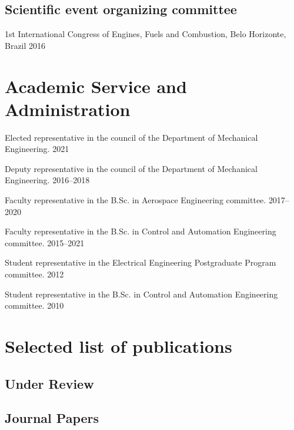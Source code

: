 \documentclass[letterpaper, 11pt, oneside]{memoir}
\begin{document}
\subsection{Scientific event organizing committee}
\begin{description}
\item %
{1st International Congress of Engines, Fuels and Combustion,
 Belo Horizonte, Brazil} \hfill {2016}
\end{description}

\section{Academic Service and Administration}
\begin{description} 
\item {%
  Elected representative in the council of the Department of Mechanical 
  Engineering.%
} \hfill {2021}
\item {%
  Deputy representative in the council of the Department of Mechanical 
  Engineering.%
} \hfill {2016--2018}
\item {%
  Faculty representative in the B.Sc. in Aerospace Engineering committee.
} \hfill {2017--2020}
\item {%
  Faculty representative in the B.Sc. in Control and Automation Engineering
  committee.
} \hfill {2015--2021}
\item {%
  Student representative in the Electrical Engineering 
  Postgraduate Program committee.
} \hfill {2012}
\item {%
  Student representative in the B.Sc. in Control and Automation Engineering
  committee.
} \hfill {2010}
\end{description}

\section{Selected list of publications}
\nocite{*}

\subsection{Under Review}
\printbibliography[
  type=unpublished, heading=none,
]

\subsection{Journal Papers}
\printbibliography[
  type=article, heading=none,
]
\end{document}
